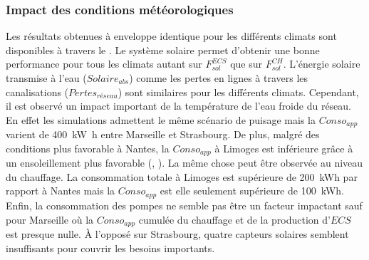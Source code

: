 \subsubsection{Impact des conditions météorologiques} %
\label{ssub:impact_des_conditions_meteorologiques}
Les résultats obtenues à enveloppe identique pour les différents climats sont disponibles
à travers le . Le système solaire permet d’obtenir une
bonne performance pour tous les climats autant sur $F_{sol}^{ECS}$ que sur $F_{sol}^{CH}$.
L’énergie solaire transmise à l’eau ($Solaire_{abs}$) comme les pertes en lignes à travers
les canalisations ($Pertes_{réseau}$) sont similaires pour les différents climats.
Cependant, il est observé un impact important de la température de l’eau froide du réseau.
En effet les simulations admettent le même scénario de puisage mais la $Conso_{app}$
varient de \SI{400}{\kilo\watt\hour} entre Marseille et Strasbourg. De plus, malgré des
conditions plus favorable à Nantes, la $Conso_{app}$ à Limoges est inférieure grâce à un
ensoleillement plus favorable (, ).
La même chose peut être observée au niveau du chauffage. La consommation totale à Limoges
est supérieure de \SI{200}{kWh} par rapport à Nantes mais la $Conso_{app}$ est elle
seulement supérieure de \SI{100}{kWh}. Enfin, la consommation des pompes ne semble pas
être un facteur impactant sauf pour Marseille où la $Conso_{app}$ cumulée du chauffage et
de la production d’$ECS$ est presque nulle. À l’opposé sur Strasbourg, quatre capteurs
solaires semblent insuffisants pour couvrir les besoins importants.

